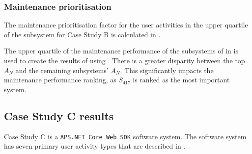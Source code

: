 \subsubsection{Maintenance prioritisation}
The maintenance prioritisation factor for the user activities in the upper quartile of the subsystem for Case Study B is calculated in .



The upper quartile of the maintenance performance of the subsystems of  in  is used to create the results of  using . There is a greater disparity between the top $A_N$ and the remaining subsystems' $A_N$. This significantly impacts the maintenance performance ranking, as $S_{417}$ is ranked as the most important system.

\subsection{Case Study C results}\label{sec:ch3_csC}
Case Study C is a \texttt{APS.NET Core Web SDK} software system. The software system has seven primary user activity types that are described in .


